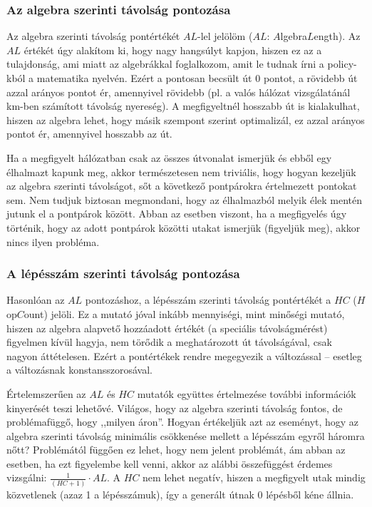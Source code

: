     \subsubsection{Az algebra szerinti távolság pontozása}
    Az algebra szerinti távolság pontértékét $AL$-lel jelölöm ($AL$: $A$lgebra$L$ength). Az $AL$ értékét úgy alakítom ki, hogy nagy hangsúlyt kapjon, hiszen ez az a tulajdonság, ami miatt az algebrákkal foglalkozom, amit le tudnak írni a policy-kból a matematika nyelvén. Ezért a pontosan becsült út 0 pontot, a rövidebb út azzal arányos pontot ér, amennyivel rövidebb (pl. a valós hálózat vizsgálatánál km-ben számított távolság nyereség). A megfigyeltnél hosszabb út is kialakulhat, hiszen az algebra lehet, hogy másik szempont szerint optimalizál, ez azzal arányos pontot ér, amennyivel hosszabb az út.

    \begin{note}
      Ha a megfigyelt hálózatban csak az összes útvonalat ismerjük és ebből egy élhalmazt kapunk meg, akkor természetesen nem triviális, hogy hogyan kezeljük az algebra szerinti távolságot, sőt a következő pontpárokra értelmezett pontokat sem. Nem tudjuk biztosan megmondani, hogy az élhalmazból melyik élek mentén jutunk el a pontpárok között. Abban az esetben viszont, ha a megfigyelés úgy történik, hogy az adott pontpárok közötti utakat ismerjük (figyeljük meg), akkor nincs ilyen probléma.
    \end{note}

    \subsubsection{A lépésszám szerinti távolság pontozása}
    Hasonlóan az $AL$ pontozáshoz, a lépésszám szerinti távolság pontértékét a $HC$ ($H$op$C$ount) jelöli. Ez a mutató jóval inkább mennyiségi, mint minőségi mutató, hiszen az algebra alapvető hozzáadott értékét (a speciális távolságmérést) figyelmen kívül hagyja, nem törődik a meghatározott út távolságával, csak nagyon áttételesen. Ezért a pontértékek rendre megegyezik a változással -- esetleg a változásnak konstansszorosával.

    \begin{note}\label{AL-HC}
      Értelemszerűen az $AL$ és $HC$ mutatók együttes értelmezése további információk kinyerését teszi lehetővé. Világos, hogy az algebra szerinti távolság fontos, de problémafüggő, hogy ,,milyen áron''. Hogyan értékeljük azt az eseményt, hogy az algebra szerinti távolság minimális csökkenése mellett a lépésszám egyről háromra nőtt? Problémától függően ez lehet, hogy nem jelent problémát, ám abban az esetben, ha ezt figyelembe kell venni, akkor az alábbi összefüggést érdemes vizsgálni: $\frac{1}{(HC+1)} \cdot AL$. A $HC$ nem lehet negatív, hiszen a megfigyelt utak mindig közvetlenek (azaz 1 a lépésszámuk), így a generált útnak 0 lépésből kéne állnia.
    \end{note}

